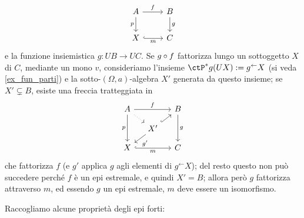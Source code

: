 \begin{remark}
\begin{itemize}
\[\begin{tikzcd}
	A & B \\
	X & C
	\arrow["f", from=1-1, to=1-2]
	\arrow["p"', from=1-1, to=2-1]
	\arrow["g", from=1-2, to=2-2]
	\arrow["m"', hook, from=2-1, to=2-2]
\end{tikzcd}\]
e la funzione insiemistica $g : UB\to UC$. Se $g\circ f$ fattorizza lungo un sottoggetto $X$ di $C$, mediante un mono $v$, consideriamo l'insieme $\ctP^*g(UX) := g^\leftarrow X$ (si veda \ref{ex_fun_parti}) e la sotto-$(\Omega,a)$-algebra $X'$ generata da questo insieme; se $X'\subsetneq B$, esiste una freccia tratteggiata in
\[\begin{tikzcd}[sep=small]
	A && B \\
	& X' \\
	X && C
	\arrow["f", from=1-1, to=1-3]
	\arrow[dotted, from=1-1, to=2-2]
	\arrow["p"', from=1-1, to=3-1]
	\arrow["g", from=1-3, to=3-3]
	\arrow[hook, from=2-2, to=1-3]
	\arrow["g'", from=2-2, to=3-1]
	\arrow["m"', hook, from=3-1, to=3-3]
\end{tikzcd}\]
che fattorizza $f$ (e $g'$ applica $g$ agli elementi di $g^\leftarrow X$); del resto questo non può succedere perché $f$ è un epi estremale, e quindi $X' = B$; allora però $g$ fattorizza attraverso $m$, ed essendo $g$ un epi estremale, $m$ deve essere un isomorfismo.
	\end{itemize}
\end{remark}
\begin{definition}
	\Todo{}
\end{definition}
Raccogliamo alcune proprietà degli epi forti:
\begin{proposition}

\end{proposition}
